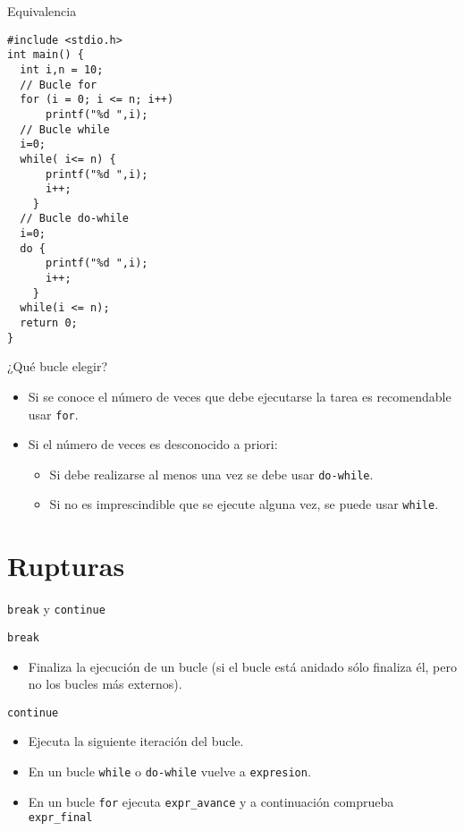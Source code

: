 \documentclass[xcolor={usenames,svgnames,dvipsnames}, aspectratio=169]{beamer}
\begin{document}
\begin{frame}[label={sec:orgf8c0f5a},fragile,plain]{Equivalencia}
 \lstset{language=C,label= ,caption= ,captionpos=b,numbers=none,basicstyle=\ttfamily\footnotesize}
\begin{lstlisting}
#include <stdio.h>
int main() {
  int i,n = 10;
  // Bucle for
  for (i = 0; i <= n; i++)
      printf("%d ",i);
  // Bucle while
  i=0;
  while( i<= n) {
      printf("%d ",i);
      i++;
    }
  // Bucle do-while
  i=0;
  do {
      printf("%d ",i);
      i++;
    }
  while(i <= n);
  return 0;
}
\end{lstlisting}
\end{frame}
\begin{frame}[label={sec:org7289153},fragile]{¿Qué bucle elegir?}
 \begin{itemize}
\item Si se conoce el número de veces que debe ejecutarse la tarea es recomendable usar \texttt{for}.
\item Si el número de veces es desconocido a priori:
\begin{itemize}
\item Si debe realizarse al menos una vez se debe usar \texttt{do-while}.
\item Si no es imprescindible que se ejecute alguna vez, se puede usar \texttt{while}.
\end{itemize}
\end{itemize}
\end{frame}
\section{Rupturas}
\label{sec:org013949c}
\begin{frame}[label={sec:org0bb498c},fragile]{\texttt{break} y \texttt{continue}}
 \begin{block}{\texttt{break}}
\begin{itemize}
\item Finaliza la ejecución de un bucle (si el bucle está anidado sólo finaliza él, pero no los bucles más externos).
\end{itemize}
\end{block}

\begin{block}{\texttt{continue}}
\begin{itemize}
\item Ejecuta la siguiente iteración del bucle.
\item En un bucle \texttt{while} o \texttt{do-while} vuelve a \texttt{expresion}.
\item En un bucle \texttt{for} ejecuta \texttt{expr\_avance} y a continuación comprueba \texttt{expr\_final}
\end{itemize}
\end{block}
\end{frame}
\end{document}
